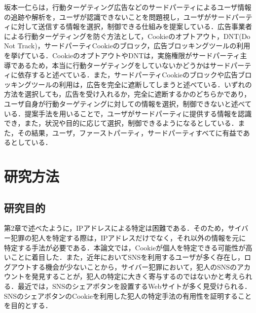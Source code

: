 \documentclass[10pt, a4paper]{jreport}
\begin{document}
坂本一仁らは，行動ターゲティング広告などのサードパーティによるユーザ情報の追跡や解析を，ユーザが認識できないことを問題視し，ユーザがサードパーティに対して送信する情報を選択，制御できる仕組みを提案している\cite{relevant_research_first_party_third_party}．広告事業者による行動ターゲティングを防ぐ方法として，Cookieのオプトアウト，DNT(Do Not Track)，サードパーティCookieのブロック，広告ブロッキングツールの利用を挙げている．CookieのオプトアウトやDNTは，実施権限がサードパーティ主導であるため，本当に行動ターゲティングをしていないかどうかはサードパーティに依存すると述べている．また，サードパーティCookieのブロックや広告ブロッキングツールの利用は，広告を完全に遮断してしまうと述べている．いずれの方法を選択しても，広告を受け入れるか，完全に遮断するかのどちらかであり，ユーザ自身が行動ターゲティングに対しての情報を選択，制御できないと述べている．提案手法を用いることで，ユーザがサードパーティに提供する情報を認識でき，また，状況や目的に応じて選択，制御できるようになるとしている．また，その結果，ユーザ，ファーストパーティ，サードパーティすべてに有益であるとしている．












\chapter{研究方法}
\section{研究目的}

第2章で述べたように，IPアドレスによる特定は困難である．そのため，サイバー犯罪の犯人を特定する際は，IPアドレスだけでなく，それ以外の情報を元に特定する手法が必要である．本論文では，Cookieが個人を特定できる可能性が高いことに着目した．また，近年においてSNSを利用するユーザが多く存在し，ログアウトする機会が少ないことから，サイバー犯罪において，犯人のSNSのアカウントを発見することが，犯人の特定に大きく寄与するのではないかと考えられる．最近では，SNSのシェアボタンを設置するWebサイトが多く見受けられる．SNSのシェアボタンのCookieを利用した犯人の特定手法の有用性を証明することを目的とする．
\end{document}
